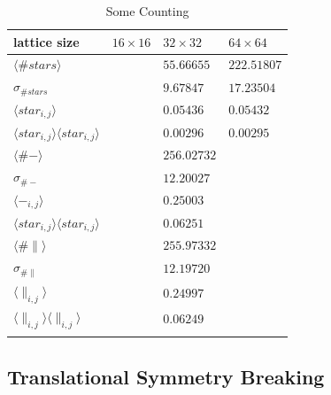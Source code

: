 \documentclass[aps,floatfix,11pt]{revtex4-1}
\begin{document}
\begin{table}[htp]
    \caption{Some Counting}
    \centering
    \begin{tabular}{l | l | l | l}
    \hline\hline
    lattice size                                            & $16\times 16$ & $32\times 32$   & $64\times 64$ \\ \hline
    $\langle \# stars \rangle$                              &               &  $55.66655$     & $ 222.51807 $\\ \hline
    $\sigma_{\# stars}$                                     &               &  $9.67847$      & $ 17.23504  $\\ \hline
    $\langle star_{i,j} \rangle$                            &               &  $0.05436$      & $ 0.05432   $\\ \hline
    $\langle star_{i,j} \rangle \langle star_{i,j} \rangle$ &               &  $0.00296$      & $ 0.00295   $\\ \hline 
    \hline
    $\langle \# - \rangle$                                  &               &$256.02732$      & \\ \hline
    $\sigma_{\# -}$                                         &               & $12.20027$      & \\ \hline
    $\langle -_{i,j} \rangle$                               &               &  $0.25003$      & \\ \hline
    $\langle star_{i,j} \rangle \langle star_{i,j} \rangle$ &               &  $0.06251$      & \\ \hline
    \hline
    $\langle \# \| \rangle$                                 &               &$255.97332$      & \\ \hline
    $\sigma_{\# \|}$                                        &               & $12.19720$      & \\ \hline
    $\langle \|_{i,j} \rangle$                              &               &  $0.24997$      & \\ \hline
    $\langle \|_{i,j} \rangle \langle \|_{i,j} \rangle$     &               &  $0.06249$      & \\ \hline \\ [1ex]
    \end{tabular}
    \label{table:counts}
\end{table}


\clearpage
\subsection{Translational Symmetry Breaking}
\end{document}
